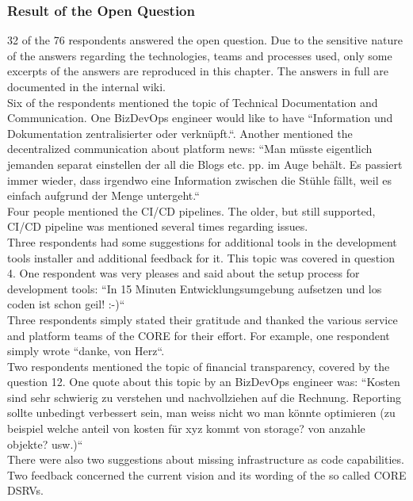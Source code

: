 \documentclass[a4paper,12pt]{article}
\begin{document}
    \subsubsection{Result of the Open Question}
    \label{sssec:ropque}
    32 of the 76 respondents answered the open question.
    Due to the sensitive nature of the answers regarding the technologies, teams and processes used, only some excerpts
    of the answers are reproduced in this chapter.
    The answers in full are documented in the internal wiki\cite{sbbdevopsexperience}.\\
    Six of the respondents mentioned the topic of Technical Documentation and Communication.
    One BizDevOps engineer would like to have ``Information und Dokumentation zentralisierter oder verknüpft.``.
    Another mentioned the decentralized communication about platform news: ``Man müsste eigentlich jemanden separat einstellen
    der all die Blogs etc. pp. im Auge behält. Es passiert immer wieder, dass irgendwo eine Information zwischen die
    Stühle fällt, weil es einfach aufgrund der Menge untergeht.``\\
    Four people mentioned the CI/CD pipelines.
    The older, but still supported, CI/CD pipeline was mentioned several times regarding issues. \\
    Three respondents had some suggestions for additional tools in the development tools installer and additional
    feedback for it.
    This topic was covered in question 4.
    One respondent was very pleases and said about the setup process for development tools: ``In 15 Minuten
    Entwicklungsumgebung aufsetzen und los coden ist schon geil! :-)``\\
    Three respondents simply stated their gratitude and thanked the various service and platform teams of the CORE for
    their effort.
    For example, one respondent simply wrote ``danke, von Herz``.\\
    Two respondents mentioned the topic of financial transparency, covered by the question 12.
    One quote about this topic by an BizDevOps engineer was: ``Kosten sind sehr schwierig zu verstehen und nachvollziehen auf die Rechnung. Reporting
    sollte unbedingt verbessert sein, man weiss nicht wo man könnte optimieren (zu beispiel welche anteil von kosten für
    xyz kommt von storage? von anzahle objekte? usw.)``\\
    There were also two suggestions about missing infrastructure as code capabilities.\\
    Two feedback concerned the current vision and its wording of the so called CORE DSRVs.\\
\end{document}
